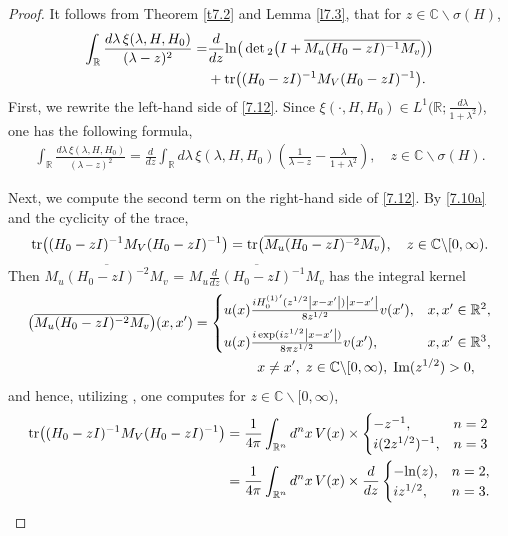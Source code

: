 \documentclass[reqno,10pt, centertags]{amsart}
\newcommand{\bbR}{{\mathbb{R}}}
\newcommand{\bbC}{{\mathbb{C}}}
\newcommand{\abs}[1]{\left\lvert#1\right\rvert}
\newcommand{\no}{\nonumber}
\newcommand{\lb}{\label}
\newcommand{\ol}{\overline}
\newcommand{\la}{\lambda}
\newcommand{\si}{\sigma}
\newcommand{\tr}{\text{\rm{tr}}}
\renewcommand{\Im}{\text{\rm Im}}
\renewcommand{\ln}{\text{\rm ln}}
\numberwithin{equation}{section}
\theoremstyle{definition}
\begin{document}
\begin{proof}
It follows from Theorem \ref{t7.2} and Lemma \ref{l7.3}, that for
$z\in\bbC\backslash\si(H)$,
\begin{align}
\begin{split}
\int_\bbR \frac{d\la\,\xi(\la,H,H_0)}{(\la-z)^2} =&
\frac{d}{dz}\ln\big(\det{}_2\big(I+\ol{M_u(H_0-zI)^{-1}M_v}\big)\big)
\lb{7.12}
\\
&+ \tr\big((H_0-zI)^{-1}M_V(H_0-zI)^{-1}\big).
\end{split}
\end{align}
First, we rewrite the left-hand side of \eqref{7.12}. Since
$\xi(\cdot,H,H_0)\in L^1\big(\bbR;\frac{d\la}{1+\la^2}\big)$, one
has the following formula,
\begin{align}
\int_\bbR \frac{d\la\,\xi(\la,H,H_0)}{(\la-z)^2} = \frac{d}{dz}
\int_\bbR
d\la\,\xi(\la,H,H_0)\left(\frac{1}{\la-z}-\frac{\la}{1+\la^2}\right),
\quad z\in\bbC\backslash\si(H). \lb{7.13}
\end{align}

Next, we compute the second term on the right-hand side of
\eqref{7.12}. By \eqref{7.10a} and the cyclicity of the trace,
\begin{align}
\tr\big((H_0-zI)^{-1}M_V(H_0-zI)^{-1}\big) =
\tr\big(\ol{M_u(H_0-zI)^{-2}M_v}\big), \quad z\in\bbC\backslash[0,\infty).
\end{align}
Then $\ol{M_u(H_0-zI)^{-2}M_v}$ = $\ol{M_u\frac{d}{dz}(H_0-zI)^{-1}M_v}$
has the integral kernel
\begin{align}
& \big(\ol{M_u(H_0-zI)^{-2}M_v}\big)(x,x')= \begin{cases}
u(x)\frac{i{H_0^{(1)}}'(z^{1/2}\abs{x-x'})\abs{x-x'}}{8 z^{1/2}}v(x'),
&x, x'\in\bbR^2, \\[2mm]
 u(x)\frac{i\exp(i z^{1/2}\abs{x-x'})}{8\pi z^{1/2}}v(x'), &
 x, x'\in\bbR^3, \end{cases}  \no \\
& \hspace*{5.8cm} x\neq x', \;
 z\in\bbC\backslash [0,\infty), \; \Im(z^{1/2})>0,
\end{align}
and hence, utilizing \cite[p.\ 1086]{DS88}, one computes for
$z\in\bbC\backslash[0,\infty)$,
\begin{align}
\begin{split}
\tr\big((H_0-zI)^{-1}M_V(H_0-zI)^{-1}\big) &=
\frac{1}{4\pi}\int_{\bbR^n} d^nx\,V(x)
\times \begin{cases} -z^{-1}, & n=2
\\
i(2 z^{1/2})^{-1}, & n=3
\end{cases}
\\
&= \frac{1}{4\pi}\int_{\bbR^n} d^nx\,V(x) \times \frac{d}{dz}
\begin{cases} -\ln(z), & n=2, \\ i z^{1/2}, & n=3. \end{cases}
\lb{7.17}
\end{split}
\end{align}


\end{proof}
\end{document}
